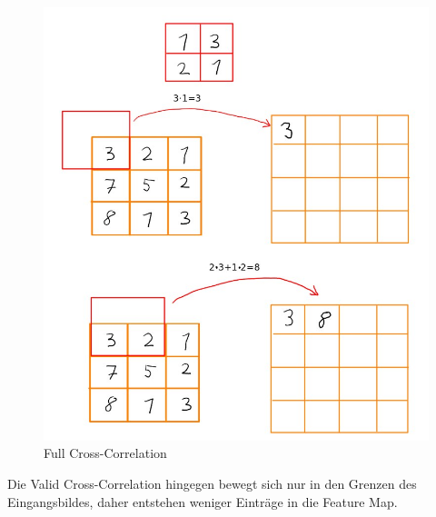 \documentclass[12pt]{article}
\begin{document}
\begin{figure}[H]
\centering
\includegraphics[scale=0.5]{./Images/004_Full_Correlation.jpg}
\caption{Full Cross-Correlation}
\label{Full Cross-Correlation}
\end{figure}
 
Die Valid Cross-Correlation hingegen bewegt sich nur in den Grenzen des Eingangsbildes, daher entstehen weniger Einträge in die Feature Map.
\end{document}
